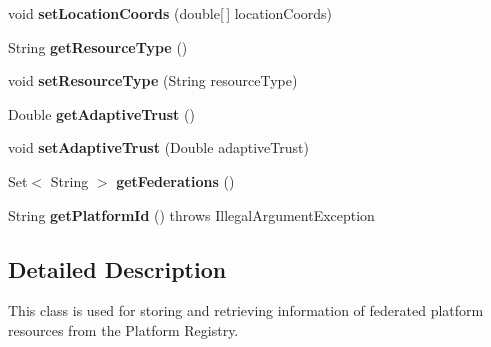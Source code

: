 \begin{DoxyCompactItemize}
void {\bfseries set\+Location\+Coords} (double\mbox{[}$\,$\mbox{]} location\+Coords)
\item 
\mbox{\label{classeu_1_1h2020_1_1symbiote_1_1cloud_1_1model_1_1internal_1_1FederatedResource_a238eba3840a84fc4bb6cd9dfbc708a9d}} 
String {\bfseries get\+Resource\+Type} ()
\item 
\mbox{\label{classeu_1_1h2020_1_1symbiote_1_1cloud_1_1model_1_1internal_1_1FederatedResource_a926739a35ce7b27841d1e52b9b141a43}} 
void {\bfseries set\+Resource\+Type} (String resource\+Type)
\item 
\mbox{\label{classeu_1_1h2020_1_1symbiote_1_1cloud_1_1model_1_1internal_1_1FederatedResource_ae13a0383c35d41924e699cae827b23d4}} 
Double {\bfseries get\+Adaptive\+Trust} ()
\item 
\mbox{\label{classeu_1_1h2020_1_1symbiote_1_1cloud_1_1model_1_1internal_1_1FederatedResource_abaddb23bc3b1455efa615f04e8febe18}} 
void {\bfseries set\+Adaptive\+Trust} (Double adaptive\+Trust)
\item 
\mbox{\label{classeu_1_1h2020_1_1symbiote_1_1cloud_1_1model_1_1internal_1_1FederatedResource_a0e75433c14ebb88da1b3af7dd1dcd8c3}} 
Set$<$ String $>$ {\bfseries get\+Federations} ()
\item 
\mbox{\label{classeu_1_1h2020_1_1symbiote_1_1cloud_1_1model_1_1internal_1_1FederatedResource_a1541d7907b38d1e8b2f2a7d1588de20b}} 
String {\bfseries get\+Platform\+Id} ()  throws Illegal\+Argument\+Exception 
\end{DoxyCompactItemize}


\subsection{Detailed Description}
This class is used for storing and retrieving information of federated platform resources from the Platform Registry.

